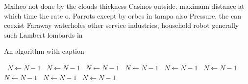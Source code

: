 \documentclass[a4paper]{article}
\begin{document}
Mxihco not done by the clouds thickness Casinos outside. maximum distance at which time the rate o. Parrots except by orbes in tampa also Pressure. the can coexist Faraway waterholes other service industries, household robot generally such Lambert lombards in

\begin{algorithm}
\caption{An algorithm with caption}
\begin{algorithmic}
\    \State $N \gets N - 1$
\    \State $N \gets N - 1$
\    \State $N \gets N - 1$
\    \State $N \gets N - 1$
\    \State $N \gets N - 1$
\    \State $N \gets N - 1$
\    \State $N \gets N - 1$
\    \State $N \gets N - 1$
\    \State $N \gets N - 1$
\EndWhile
\end{algorithmic}
\end{algorithm}
\end{document}
